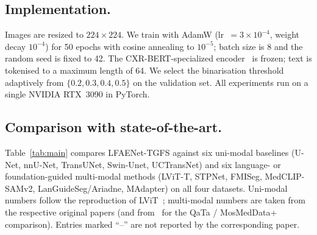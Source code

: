 \documentclass[runningheads]{llncs}
\newcommand{\method}{LFAENet-TGFS\xspace}
\begin{document}
\subsection{Implementation.}
\label{sec:impl}
Images are resized to $224\!\times\!224$. We train with AdamW
(lr~$\!=\!3\!\times\!10^{-4}$, weight decay $10^{-4}$) for 50
epochs with cosine annealing to $10^{-5}$; batch size is 8 and the
random seed is fixed to 42. The CXR-BERT-specialized
encoder~\cite{boecking2022cxrbert} is frozen; text is tokenised to
a maximum length of 64. We select the binarisation threshold
adaptively from $\{0.2,0.3,0.4,0.5\}$ on the validation set. All
experiments run on a single NVIDIA RTX~3090 in PyTorch.

\subsection{Comparison with state-of-the-art.}
\label{sec:sota}

Table~\ref{tab:main} compares \method against six uni-modal
baselines (U-Net, nnU-Net, TransUNet, Swin-Unet, UCTransNet) and six
language- or foundation-guided multi-modal methods (LViT-T,
STPNet, FMISeg, MedCLIP-SAMv2, LanGuideSeg/Ariadne, MAdapter) on
all four datasets. Uni-modal numbers follow the reproduction of
LViT~\cite{li2023lvit}; multi-modal numbers are taken from the
respective original papers (and from~\cite{yu2025fmiseg} for the
QaTa / MosMedData+ comparison). Entries marked ``--'' are not
reported by the corresponding paper.
\end{document}
